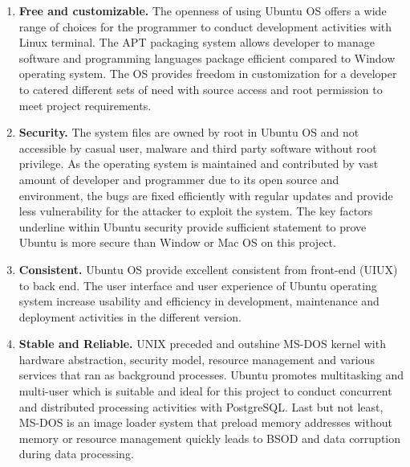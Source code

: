 \begin{enumerate}[topsep=0pt,itemsep=-1ex,partopsep=1ex,parsep=1.5ex]
	
	\item \textbf{Free and customizable.} The openness of using Ubuntu OS offers a wide range of choices for the programmer to conduct development activities with Linux terminal. The APT packaging system allows developer to manage software and programming languages package efficient compared to Window operating system. The OS provides freedom in customization for a developer to catered different sets of need with source access and root permission to meet project requirements.
	\newline
	
	\item \textbf{Security.} The system files are owned by root in Ubuntu OS and not accessible by casual user, malware and third party software without root privilege. \cite{ubuntu-secure-than-window} As the operating system is maintained and contributed by vast amount of developer and programmer due to its open source and environment, the bugs are fixed efficiently with regular updates and provide less vulnerability for the attacker to exploit the system. \cite{linux-secure-than-window} The key factors underline within Ubuntu security provide sufficient statement to prove Ubuntu is more secure than Window or Mac OS on this project.	
	\newline
	
	\item \textbf{Consistent.} Ubuntu OS provide excellent consistent from front-end (UIUX) to back end. The user interface and user experience of Ubuntu operating system increase usability and efficiency in development, maintenance and deployment activities in the different version.
	\newline
	
	\item \textbf{Stable and Reliable.} UNIX preceded and outshine MS-DOS kernel with hardware abstraction, security model, resource management and various services that ran as background processes. \cite{difference-unix-msdos} Ubuntu promotes multitasking and multi-user which is suitable and ideal for this project to conduct concurrent and distributed processing activities with PostgreSQL. Last but not least, MS-DOS is an image loader system that preload memory addresses without memory or resource management quickly leads to BSOD and data corruption during data processing.
	
	
\end{enumerate}


